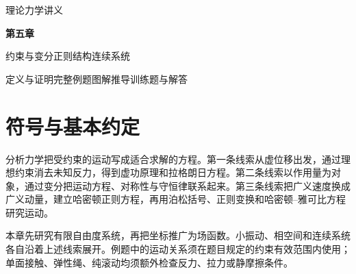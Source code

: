 \documentclass[UTF8,zihao=-4,fontset=fandol,a4paper]{ctexart}
\begin{document}
\begin{titlepage}\centering\vspace*{18mm}
{\small\color{muted}理论力学讲义\par}\vspace{12mm}
{\Huge\bfseries 第五章\par}\vspace{10mm}
{\large 约束与变分\quad 正则结构\quad 连续系统\par}\vspace{12mm}
\vfill
{\normalsize 定义与证明\quad 完整例题\quad 图解推导\quad 训练题与解答\par}\vspace{10mm}\end{titlepage}
\section*{符号与基本约定}
分析力学把受约束的运动写成适合求解的方程。第一条线索从虚位移出发，通过理想约束消去未知反力，得到虚功原理和拉格朗日方程。第二条线索以作用量为对象，通过变分把运动方程、对称性与守恒律联系起来。第三条线索把广义速度换成广义动量，建立哈密顿正则方程，再用泊松括号、正则变换和哈密顿--雅可比方程研究运动。

本章先研究有限自由度系统，再把坐标推广为场函数。小振动、相空间和连续系统各自沿着上述线索展开。例题中的运动关系须在题目规定的约束有效范围内使用；单面接触、弹性绳、纯滚动均须额外检查反力、拉力或静摩擦条件。
\end{document}

